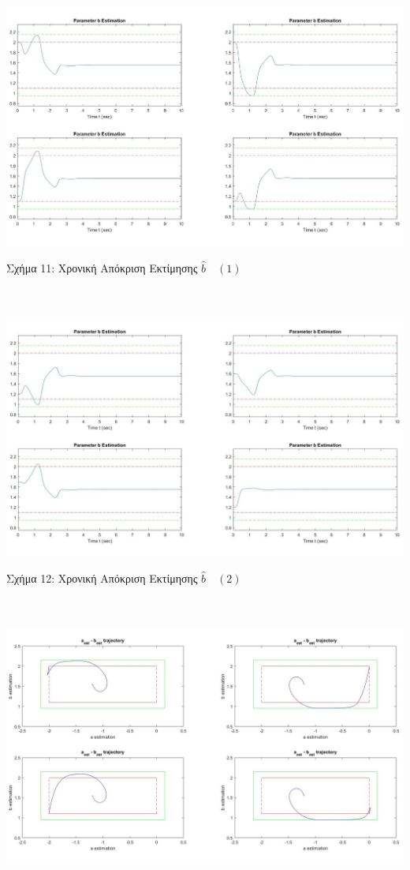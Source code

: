 \documentclass[12pt]{article}
\begin{document}
\includegraphics[width=\linewidth]{b_est_b1.jpg}
\centerline{Σχήμα 11:  Χρονική Απόκριση Εκτίμησης $\hat{b} \quad (1)$}
\\ \\
\includegraphics[width=\linewidth]{b_est_b2.jpg}
\centerline{Σχήμα 12:  Χρονική Απόκριση Εκτίμησης $\hat{b} \quad (2)$}
\\ \\
\includegraphics[width=\linewidth]{ab_est_b1.jpg}
\end{document}
